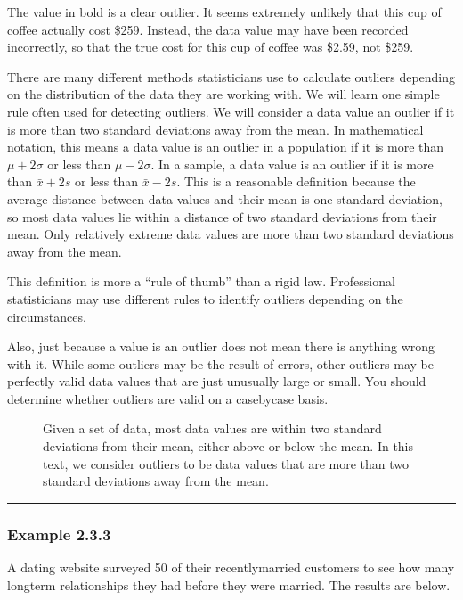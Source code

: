 \documentclass[letterpaper,10pt,english]{jupyterBook}
\begin{document}
\sphinxAtStartPar
The value in bold is a clear outlier. It seems extremely unlikely that this cup of coffee actually cost \$259. Instead, the data value may have been recorded incorrectly, so that the true cost for this cup of coffee was \$2.59, not \$259.

\sphinxAtStartPar
There are many different methods statisticians use to calculate outliers depending on the distribution of the data they are working with. We will learn one simple rule often used for detecting outliers. We will consider a data value an outlier if it is more than two standard deviations away from the mean. In mathematical notation, this means a data value is an outlier in a population if it is more than \(\mu + 2\sigma\) or less than \(\mu - 2\sigma\). In a sample, a data value is an outlier if it is more than \(\bar{x} + 2s\) or less than \(\bar{x} - 2s\). This is a reasonable definition because the average distance between data values and their mean is one standard deviation, so most data values lie within a distance of two standard deviations from their mean. Only relatively extreme data values are more than two standard deviations away from the mean.

\sphinxAtStartPar
This definition is more a “rule of thumb” than a rigid law. Professional statisticians may use different rules to identify outliers depending on the circumstances.

\sphinxAtStartPar
Also, just because a value is an outlier does not mean there is anything wrong with it. While some outliers may be the result of errors, other outliers may be perfectly valid data values that are just unusually large or small. You should determine whether outliers are valid on a case\sphinxhyphen{}by\sphinxhyphen{}case basis.

\begin{figure}[htbp]
\centering
\capstart

\noindent{}
\caption{Given a set of data, most data values are within two standard deviations from their mean, either above or below the mean. In this text, we consider outliers to be data values that are more than two standard deviations away from the mean.}\label{\detokenize{Ch2 Descriptive Statistics/2.3 Measures of Dispersion:outlier-example}}\end{figure}


\bigskip\hrule\bigskip



\subsubsection{Example 2.3.3}
\label{\detokenize{Ch2 Descriptive Statistics/2.3 Measures of Dispersion:example-2-3-3}}
\sphinxAtStartPar
A dating website surveyed 50 of their recently\sphinxhyphen{}married customers to see how many long\sphinxhyphen{}term relationships they had before they were married. The results are below.
\end{document}
